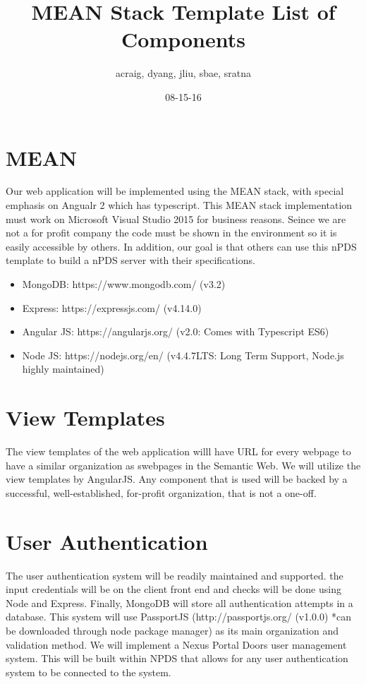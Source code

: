 \documentclass[12pt]{article}
\title{MEAN Stack Template List of Components}
\author{acraig, dyang, jliu, sbae, sratna}
\date{08-15-16}
\begin{document}
\maketitle

\section{MEAN}
Our web application will be implemented using the MEAN stack, with special emphasis on Angualr 2 which has typescript. This MEAN stack implementation must work on Microsoft Visual Studio 2015 for business reasons. Seince we are not a for profit company the code must be shown in the environment so it is easily accessible by others. In addition, our goal is that others can use this nPDS template to build a nPDS server with their specifications. 
\begin{itemize}
	\item{MongoDB: https://www.mongodb.com/ (v3.2)}
	\item{Express: https://expressjs.com/ (v4.14.0)}
	\item{Angular JS: https://angularjs.org/ (v2.0: Comes with Typescript ES6)}
	\item{Node JS: https://nodejs.org/en/ (v4.4.7LTS: Long Term Support, Node.js highly maintained)}
\end{itemize}
\section{View Templates}
The view templates of the web application willl have URL for every webpage to have a similar organization as swebpages in the Semantic Web. We will utilize the view templates by AngularJS. Any component that is used will be backed by a successful, well-established, for-profit organization, that is not a one-off.

\section{User Authentication}
The user authentication system will be readily maintained and supported. the input credentials will be on the client front end and checks will be done using Node and Express. Finally, MongoDB will store all authentication attempts in a database. This system will use PassportJS (http://passportjs.org/ (v1.0.0) *can be downloaded through node package manager) as its main organization and validation method. We will implement a Nexus Portal Doors user management system. This will be built within NPDS that allows for any user authentication system to be connected to the system.
\end{document}
